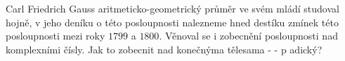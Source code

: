 \documentclass[12pt]{report}
\begin{document}
Carl Friedrich Gauss aritmeticko-geometrický průměr ve svém mládí studoval hojně, v jeho deníku o této posloupnosti nalezneme hned destíku zmínek této posloupnosti mezi roky $1799$ a $1800$. Věnoval se i zobecnění posloupnosti nad komplexními čísly. Jak to zobecnit nad konečnýma tělesama - - p adický?





\end{document}
